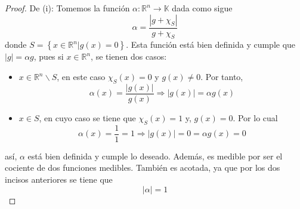 \documentclass[12pt]{report}
\theoremstyle{largebreak}
\newcommand\abs[1]{\ensuremath{\left|#1\right|}}
\newcommand\cf[3]{\ensuremath{#1:#2\rightarrow#3}}
\begin{document}
    \begin{proof}
        De (i): Tomemos la función $\cf{\alpha}{\mathbb{R}^n}{\mathbb{K}}$ dada como sigue
        \begin{equation*}
            \alpha=\frac{\abs{g+\chi_S}}{g+\chi_S}
        \end{equation*}
        donde $S=\left\{x\in\mathbb{R}^n\Big|g(x)=0 \right\}$. Esta función está bien definida y cumple que $\abs{g}=\alpha g$, pues si $x\in\mathbb{R}^n$, se tienen dos casos:
        \begin{itemize}
            \item $x\in\mathbb{R}^n\backslash S$, en este caso $\chi_S(x)=0$ y $g(x)\neq0$. Por tanto,
            \begin{equation*}
                \alpha(x)=\frac{\abs{g(x)}}{g(x)}\Rightarrow \abs{g(x)}=\alpha g(x)
            \end{equation*}
            \item $x\in S$, en cuyo caso se tiene que $\chi_S(x)=1$ y, $g(x)=0$. Por lo cual
            \begin{equation*}
                \alpha(x)=\frac{1}{1}=1\Rightarrow\abs{g(x)}=0=\alpha g(x)=0
            \end{equation*}
        \end{itemize}
        así, $\alpha$ está bien definida y cumple lo deseado. Además, es medible por ser el cociente de dos funciones medibles. También es acotada, ya que por los dos incisos anteriores se tiene que
        \begin{equation*}
            \abs{\alpha}=1
        \end{equation*}


\end{proof}
\end{document}
